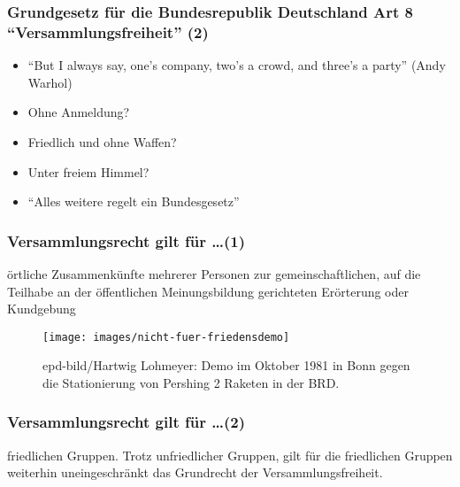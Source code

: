 \documentclass[]{beamer}
\begin{document}
	\begin{frame}
	\frametitle{Grundgesetz für die Bundesrepublik Deutschland Art 8 \enquote{Versammlungsfreiheit} (2)}
	\begin{itemize}
		\item \enquote{But I always say, one's company, two's a crowd, and three's a party} (Andy Warhol)
		\item Ohne Anmeldung?
		\item Friedlich und ohne Waffen?
		\item Unter freiem Himmel?
		\item \enquote{Alles weitere regelt ein Bundesgesetz}
	\end{itemize}
	\end{frame}

	\begin{frame}
	\frametitle{Versammlungsrecht gilt für \dots (1)}
	örtliche Zusammenkünfte mehrerer Personen zur gemeinschaftlichen, auf die Teilhabe an der öffentlichen Meinungsbildung gerichteten Erörterung oder Kundgebung
	\begin{figure}[h!]
	\renewcommand{\figurename}{Foto} 
	\texttt{[image: images/nicht-fuer-friedensdemo]}
	\caption{{\small epd-bild/Hartwig Lohmeyer: Demo im Oktober 1981 in Bonn gegen die Stationierung von Pershing 2 Raketen in der BRD.}}
	\end{figure}	
	\end{frame}


	\begin{frame}
	\frametitle{Versammlungsrecht gilt für \dots (2)}
	friedlichen Gruppen.
	\vfill
	Trotz unfriedlicher Gruppen, gilt für die friedlichen Gruppen weiterhin uneingeschränkt das Grundrecht der Versammlungsfreiheit.	
	\end{frame}
\end{document}
